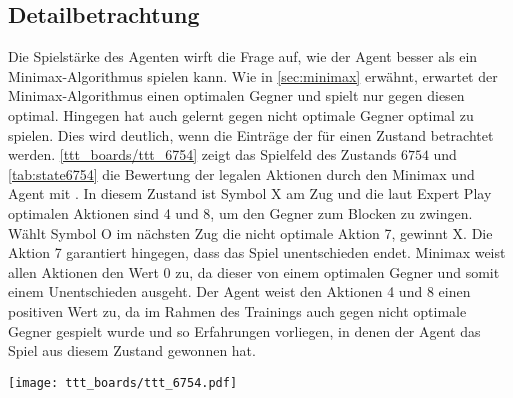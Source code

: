 

\subsection{Detailbetrachtung}
Die Spielstärke des \qlearning Agenten wirft die Frage auf, wie der Agent besser als ein Minimax-Algorithmus spielen kann. 
Wie in \cref{sec:minimax} erwähnt, erwartet der  Minimax-Algorithmus einen optimalen Gegner und spielt nur gegen diesen optimal. 
Hingegen hat \qlearning auch gelernt gegen nicht optimale Gegner optimal zu spielen.
Dies wird deutlich, wenn die Einträge der \qtable \bzw \wtable für einen Zustand betrachtet werden. 
\cref{ttt_boards/ttt_6754} zeigt das Spielfeld des Zustands $6754$ und \cref{tab:state6754} die Bewertung der legalen Aktionen durch den Minimax und \qlearning Agent mit \wtable. 
In diesem Zustand ist Symbol X am Zug und die laut Expert Play optimalen Aktionen sind 4 und 8, um den Gegner zum Blocken zu zwingen. 
Wählt Symbol O im nächsten Zug die nicht optimale Aktion 7, gewinnt X. 
Die Aktion 7 garantiert hingegen, dass das Spiel unentschieden endet. 
Minimax weist allen Aktionen den Wert 0 zu, da dieser von einem optimalen Gegner und somit einem Unentschieden ausgeht. 
Der \qlearning Agent weist den Aktionen 4 und 8 einen positiven Wert zu, da im Rahmen des Trainings auch gegen nicht optimale Gegner gespielt wurde und so Erfahrungen vorliegen, in denen der Agent das Spiel aus diesem Zustand gewonnen hat. 

\begin{minipage}{\textwidth}
  \begin{minipage}[b]{0.49\textwidth}
    \centering
    \captionsetup{type=figure}
    \texttt{[image: ttt\_boards/ttt\_6754.pdf]}
    \label{ttt_boards/ttt_6754}
  \end{minipage}
  \hfill
  \begin{minipage}[b]{0.49\textwidth}
    \centering
        \captionsetup{type=table}
    
    \label{tab:state6754}
    \end{minipage}
\end{minipage}

